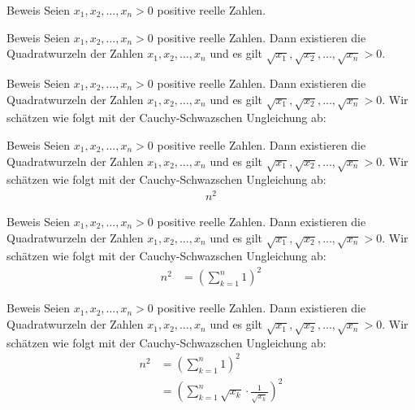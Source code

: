 \documentclass[10pt]{beamer}
\begin{document}
\begin{frame}{Beweis}
    Seien \( x_{1}, x_{2}, \ldots, x_{n} > 0 \) positive reelle Zahlen. 
\end{frame}



\begin{frame}{Beweis}
    Seien \( x_{1}, x_{2}, \ldots, x_{n} > 0 \) positive reelle Zahlen. Dann existieren die Quadratwurzeln der Zahlen \( x_{1}, x_{2}, \ldots, x_{n} \) und es gilt \( \sqrt{x_{1}}, \sqrt{x_{2}}, \ldots, \sqrt{x_{n}} > 0 \). 
\end{frame}



\begin{frame}{Beweis}
    Seien \( x_{1}, x_{2}, \ldots, x_{n} > 0 \) positive reelle Zahlen. Dann existieren die Quadratwurzeln der Zahlen \( x_{1}, x_{2}, \ldots, x_{n} \) und es gilt \( \sqrt{x_{1}}, \sqrt{x_{2}}, \ldots, \sqrt{x_{n}} > 0 \). Wir schätzen wie folgt mit der Cauchy-Schwazschen Ungleichung ab: 
\end{frame}



\begin{frame}{Beweis}
    Seien \( x_{1}, x_{2}, \ldots, x_{n} > 0 \) positive reelle Zahlen. Dann existieren die Quadratwurzeln der Zahlen \( x_{1}, x_{2}, \ldots, x_{n} \) und es gilt \( \sqrt{x_{1}}, \sqrt{x_{2}}, \ldots, \sqrt{x_{n}} > 0 \). Wir schätzen wie folgt mit der Cauchy-Schwazschen Ungleichung ab:
    \begin{align*}
        n^{2}
    \end{align*}
\end{frame}



\begin{frame}{Beweis}
    Seien \( x_{1}, x_{2}, \ldots, x_{n} > 0 \) positive reelle Zahlen. Dann existieren die Quadratwurzeln der Zahlen \( x_{1}, x_{2}, \ldots, x_{n} \) und es gilt \( \sqrt{x_{1}}, \sqrt{x_{2}}, \ldots, \sqrt{x_{n}} > 0 \). Wir schätzen wie folgt mit der Cauchy-Schwazschen Ungleichung ab:
    \begin{align*}
        n^{2}
        & = \left( \sum_{k = 1}^{n} 1 \right)^{2}
    \end{align*}
\end{frame}



\begin{frame}{Beweis}
    Seien \( x_{1}, x_{2}, \ldots, x_{n} > 0 \) positive reelle Zahlen. Dann existieren die Quadratwurzeln der Zahlen \( x_{1}, x_{2}, \ldots, x_{n} \) und es gilt \( \sqrt{x_{1}}, \sqrt{x_{2}}, \ldots, \sqrt{x_{n}} > 0 \). Wir schätzen wie folgt mit der Cauchy-Schwazschen Ungleichung ab:
    \begin{align*}
        n^{2}
        & = \left( \sum_{k = 1}^{n} 1 \right)^{2} \\
        & = \left( \sum_{k = 1}^{n} \sqrt{x_{k}} \cdot \frac{1}{\sqrt{x_{k}}} \right)^{2}
    \end{align*}
\end{frame}
\end{document}
